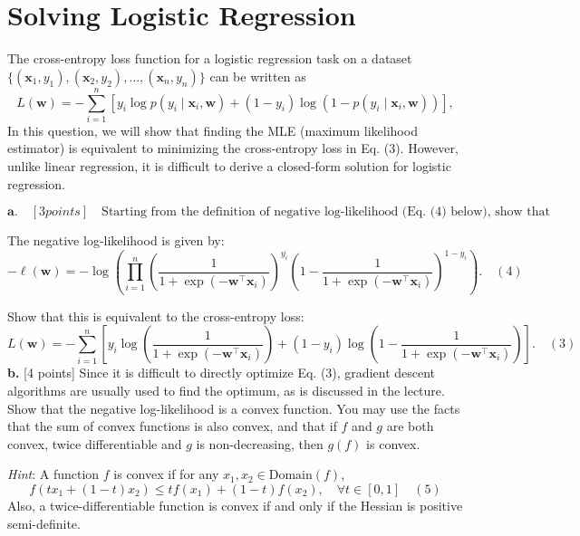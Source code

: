 \documentclass[a3paper,12pt]{extarticle} %
\begin{document}
\newpage
\section{Solving Logistic Regression}
The cross-entropy loss function for a logistic regression task on a dataset \( \{(\mathbf{x}_1, y_1), (\mathbf{x}_2, y_2), \dots, (\mathbf{x}_n, y_n)\} \) can be written as
\[
L(\mathbf{w}) = -\sum_{i=1}^n \left[ y_i \log p(y_i \mid \mathbf{x}_i, \mathbf{w}) + (1 - y_i) \log (1 - p(y_i \mid \mathbf{x}_i, \mathbf{w})) \right],
\]
In this question, we will show that finding the MLE (maximum likelihood estimator) is equivalent to minimizing the cross-entropy loss in Eq. (3). However, unlike linear regression, it is difficult to derive a closed-form solution for logistic regression.

\[
\textbf{a.} \quad [3 points] \quad \text{Starting from the definition of negative log-likelihood (Eq. (4) below), show that it is equal to the cross-entropy loss (Eq. (3)).}
\]

The negative log-likelihood is given by:
\[
-\ell(\mathbf{w}) = -\log \left( \prod_{i=1}^n \left( \frac{1}{1 + \exp(-\mathbf{w}^\top \mathbf{x}_i)} \right)^{y_i} \left( 1 - \frac{1}{1 + \exp(-\mathbf{w}^\top \mathbf{x}_i)} \right)^{1 - y_i} \right). \quad (4)
\]

Show that this is equivalent to the cross-entropy loss:
\[
L(\mathbf{w}) = -\sum_{i=1}^n \left[ y_i \log \left( \frac{1}{1 + \exp(-\mathbf{w}^\top \mathbf{x}_i)} \right) + (1 - y_i) \log \left( 1 - \frac{1}{1 + \exp(-\mathbf{w}^\top \mathbf{x}_i)} \right) \right]. \quad (3)
\]
\textbf{b.} [4 points] Since it is difficult to directly optimize Eq. (3), gradient descent algorithms are usually used to find the optimum, as is discussed in the lecture. Show that the negative log-likelihood is a convex function. You may use the facts that the sum of convex functions is also convex, and that if $f$ and $g$ are both convex, twice differentiable and $g$ is non-decreasing, then $g(f)$ is convex.

\textit{Hint}: A function $f$ is convex if for any $x_1, x_2 \in \text{Domain}(f)$,
\[
f(tx_1 + (1 - t)x_2) \leq t f(x_1) + (1 - t) f(x_2), \quad \forall t \in [0, 1] \quad (5)
\]
Also, a twice-differentiable function is convex if and only if the Hessian is positive semi-definite.
\end{document}
